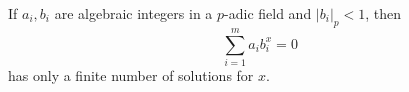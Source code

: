 \begin{proposition}
    If $a_i,b_i$ are algebraic integers in a $p$-adic field and $|b_i|_p<1$, then
\[
    \sum_{i=1}^{m}a_i b_i^x=0
\]
    has only a finite number of solutions for $x$.
\end{proposition}
